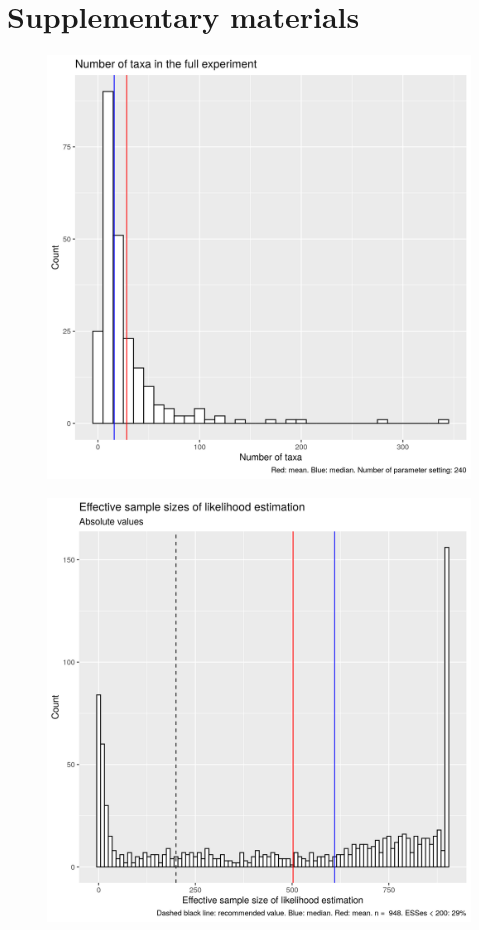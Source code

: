 \section{Supplementary materials}

\begin{figure}[!htbp]
  \includegraphics[width=\textwidth]{20190905_fig_n_taxa.png}
  \label{fig:n_taxa}
\end{figure}

\begin{figure}[!htbp]
  \includegraphics[width=\textwidth]{20190905_fig_esses.png}
  \label{fig:esses}
\end{figure}


